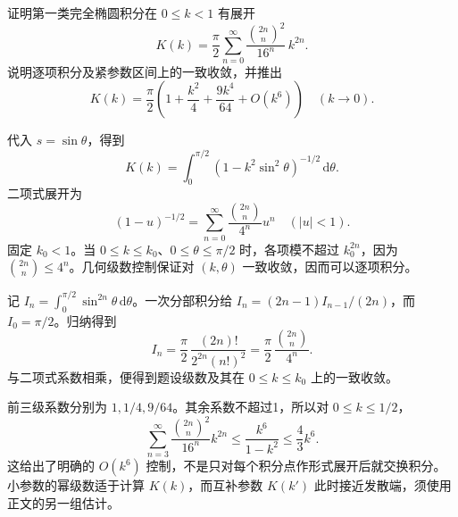 \begin{exercise}\label{b3:ex:07-6}
证明第一类完全椭圆积分在 \(0\le k<1\) 有展开
\[
 K(k)=\frac\pi2\sum_{n=0}^{\infty}
       \frac{\binom{2n}{n}^2}{16^n}\,k^{2n}.
\]
说明逐项积分及紧参数区间上的一致收敛，并推出
\[
 K(k)=\frac\pi2\left(1+\frac{k^2}{4}
                  +\frac{9k^4}{64}+O(k^6)\right)
 \quad(k\to0).
\]
\end{exercise}
\begin{solution}
代入 \(s=\sin\theta\)，得到
\[
 K(k)=\int_0^{\pi/2}(1-k^2\sin^2\theta)^{-1/2}\,\mathrm d\theta.
\]
二项式展开为
\[
 (1-u)^{-1/2}
 =\sum_{n=0}^{\infty}\frac{\binom{2n}{n}}{4^n}u^n
 \quad(|u|<1).
\]
固定 \(k_0<1\)。当 \(0\le k\le k_0\)、\(0\le\theta\le\pi/2\) 时，各项模不超过 \(k_0^{2n}\)，因为 \(\binom{2n}{n}\le4^n\)。几何级数控制保证对 \((k,\theta)\) 一致收敛，因而可以逐项积分。

记 \(I_n=\int_0^{\pi/2}\sin^{2n}\theta\,\mathrm d\theta\)。一次分部积分给
\(I_n=(2n-1)I_{n-1}/(2n)\)，而 \(I_0=\pi/2\)。归纳得到
\[
 I_n=\frac\pi2\,\frac{(2n)!}{2^{2n}(n!)^2}
 =\frac\pi2\,\frac{\binom{2n}{n}}{4^n}.
\]
与二项式系数相乘，便得到题设级数及其在 \(0\le k\le k_0\) 上的一致收敛。

前三级系数分别为 \(1,1/4,9/64\)。其余系数不超过1，所以对 \(0\le k\le1/2\)，
\[
 \sum_{n=3}^{\infty}
 \frac{\binom{2n}{n}^2}{16^n}k^{2n}
 \le\frac{k^6}{1-k^2}\le\frac43k^6.
\]
这给出了明确的 \(O(k^6)\) 控制，不是只对每个积分点作形式展开后就交换积分。小参数的幂级数适于计算 \(K(k)\)，而互补参数 \(K(k')\) 此时接近发散端，须使用正文的另一组估计。
\end{solution}

